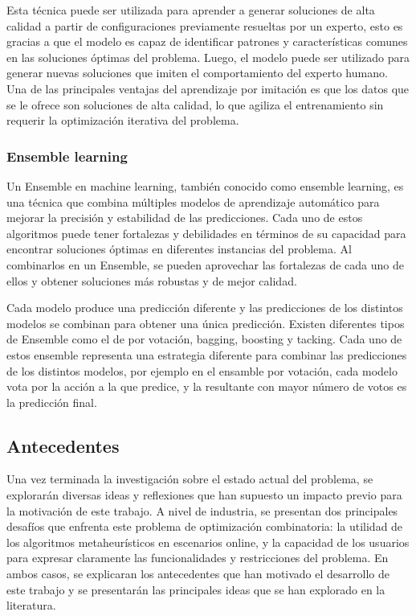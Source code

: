 Esta técnica puede ser utilizada para aprender a generar soluciones de alta
calidad a partir de configuraciones previamente resueltas por un experto, esto
es gracias a que el modelo es capaz de identificar patrones y características
comunes en las soluciones óptimas del problema. Luego, el modelo puede ser
utilizado para generar nuevas soluciones que imiten el comportamiento del
experto humano. Una de las principales ventajas del aprendizaje por imitación
es que los datos que se le ofrece son soluciones de alta calidad, lo que
agiliza el entrenamiento sin requerir la optimización iterativa del problema.

\subsubsection{Ensemble learning}
Un Ensemble en machine learning, también conocido como ensemble learning, es
una técnica que combina múltiples modelos de aprendizaje automático para
mejorar la precisión y estabilidad de las predicciones. Cada uno de estos
algoritmos puede tener fortalezas y debilidades en términos de su capacidad
para encontrar soluciones óptimas en diferentes instancias del problema. Al
combinarlos en un Ensemble, se pueden aprovechar las fortalezas de cada uno de
ellos y obtener soluciones más robustas y de mejor calidad.\medskip

Cada modelo produce una predicción diferente y las predicciones de los
distintos modelos se combinan para obtener una única predicción. Existen
diferentes tipos de Ensemble como el de por votación, bagging, boosting y
tacking. Cada uno de estos ensemble representa una estrategia diferente para
combinar las predicciones de los distintos modelos, por ejemplo en el ensamble
por votación, cada modelo vota por la acción a la que predice, y la resultante
con mayor número de votos es la predicción final.

\subsection{Antecedentes}
Una vez terminada la investigación sobre el estado actual del problema, se
explorarán diversas ideas y reflexiones que han supuesto un impacto previo para
la motivación de este trabajo. A nivel de industria, se presentan dos
principales desafíos que enfrenta este problema de optimización combinatoria:
la utilidad de los algoritmos metaheurísticos en escenarios online, y la
capacidad de los usuarios para expresar claramente las funcionalidades y
restricciones del problema. En ambos casos, se explicaran los antecedentes que
han motivado el desarrollo de este trabajo y se presentarán las principales
ideas que se han explorado en la literatura.\medskip

